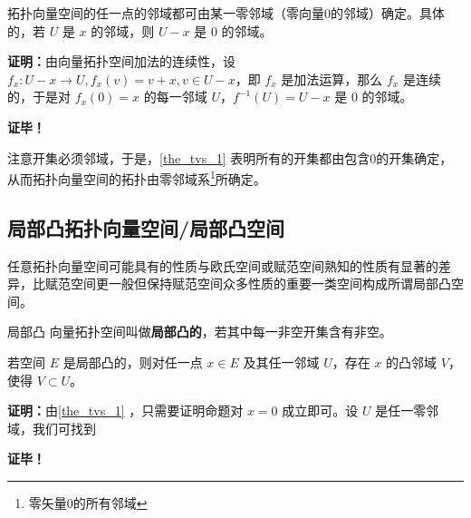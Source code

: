 \begin{theorem}{}\label{the_tvs_1}
拓扑向量空间的任一点的邻域都可由某一零邻域（零向量0的邻域）确定。具体的，若 $U$ 是 $x$ 的邻域，则 $U-x$ 是 $0$ 的邻域。
\end{theorem}

\textbf{证明：}由向量拓扑空间加法的连续性，设 $f_x:U-x\rightarrow U,f_x(v)=v+x,v\in U-x$，即 $f_x$ 是加法运算，那么 $f_x$ 是连续的，于是对 $f_x(0)=x$ 的每一邻域 $U$，$f^{-1}(U)=U-x$ 是 $0$ 的邻域。

\textbf{证毕！}

注意开集必须邻域，于是，\autoref{the_tvs_1} 表明所有的开集都由包含0的开集确定，从而拓扑向量空间的拓扑由零邻域系\footnote{零矢量0的所有邻域}所确定。


\subsection{局部凸拓扑向量空间/局部凸空间}
任意拓扑向量空间可能具有的性质与欧氏空间或赋范空间熟知的性质有显著的差异，比赋范空间更一般但保持赋范空间众多性质的重要一类空间构成所谓局部凸空间。

\begin{definition}{局部凸}
向量拓扑空间叫做\textbf{局部凸的}，若其中每一非空开集含有非空。
\end{definition}

\begin{theorem}{}
若空间 $E$ 是局部凸的，则对任一点 $x\in E$ 及其任一邻域 $U$，存在 $x$ 的凸邻域 $V$，使得 $V\subset U$。
\end{theorem}

\textbf{证明：}由\autoref{the_tvs_1} ，只需要证明命题对 $x=0$ 成立即可。设 $U$ 是任一零邻域，我们可找到


\textbf{证毕！}







